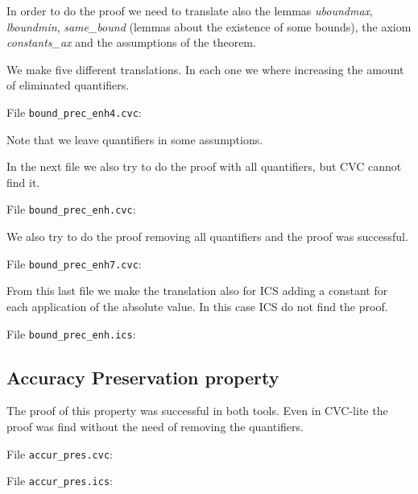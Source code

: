 \documentclass[11pt,a4paper]{article}
\begin{document}
In order to do the proof we need to translate also the lemmas
\emph{uboundmax}, \emph{lboundmin}, \emph{same\_bound} (lemmas about
the existence of some bounds), the axiom \emph{constants\_ax} and the
assumptions of the theorem.

We make five different translations. In each one we where increasing
the amount of eliminated quantifiers. 



File \verb|bound_prec_enh4.cvc|:


Note that we leave quantifiers in some assumptions.

In the next file we also try to do the proof with all quantifiers,
but CVC cannot find it.

File \verb|bound_prec_enh.cvc|:


We also try to do the proof removing all quantifiers and the proof
was successful.

File \verb|bound_prec_enh7.cvc|:


From this last file we make the translation also for ICS adding a
constant for each application of the absolute value. In this case ICS
do not find the proof.

File \verb|bound_prec_enh.ics|:


\subsection{Accuracy Preservation property}
\label{sec:accur_pres}

The proof of this property was successful in both tools. Even in
CVC-lite the proof was find without the need of removing the
quantifiers.

File \verb|accur_pres.cvc|:


File \verb|accur_pres.ics|:





\end{document}
